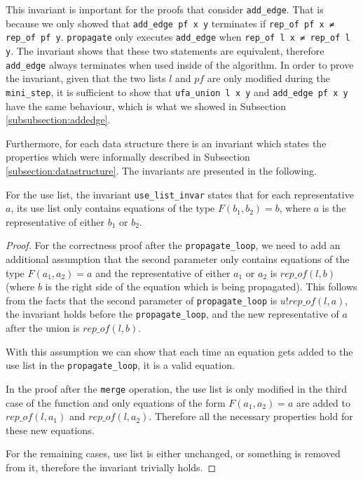 This invariant is important for the proofs that consider \lstinline{add_edge}. That is because we only showed that \lstinline{add_edge pf x y} terminates if \lstinline{rep_of pf x ≠ rep_of pf y}. \lstinline{propagate} only executes \lstinline{add_edge} when \lstinline{rep_of l x ≠ rep_of l y}. The invariant shows that these two statements are equivalent, therefore \lstinline{add_edge} always terminates when used inside of the algorithm.
In order to prove the invariant, given that the two lists $l$ and $pf$ are only modified during the \lstinline{mini_step}, it is sufficient to show that \lstinline{ufa_union l x y} and \lstinline{add_edge pf x y} have the same behaviour, which is what we showed in Subsection \ref{subsubsection:addedge}.

Furthermore, for each data structure there is an invariant which states the properties which were informally described in Subsection \ref{subsection:datastructure}. The invariants are presented in the following.

For the use list, the invariant \lstinline|use_list_invar| states that for each representative $a$, its use list only contains equations of the type $F(b_1, b_2) = b$, where $a$ is the representative of either $b_1$ or $b_2$.

\begin{proof}
For the correctness proof after the \lstinline{propagate_loop}, we need to add an additional assumption that the second parameter only contains equations of the type $F(a_1, a_2) = a$ and the representative of either $a_1$ or $a_2$ is $rep\_of(l, b)$ (where $b$ is the right side of the equation which is being propagated). This follows from the facts that the second parameter of \lstinline{propagate_loop} is $u ! rep\_of(l, a)$, the invariant holds before the \lstinline{propagate_loop}, and the new representative of $a$ after the union is $rep\_of(l, b)$.

With this assumption we can show that each time an equation gets added to the use list in the \lstinline{propagate_loop}, it is a valid equation.

In the proof after the \lstinline{merge} operation, the use list is only modified in the third case of the function and only equations of the form $F(a_1, a_2) = a$ are added to $rep\_of(l, a_1)$  and $rep\_of(l, a_2)$. Therefore all the necessary properties hold for these new equations.

For the remaining cases, use list is either unchanged, or something is removed from it, therefore the invariant trivially holds.
\end{proof}

